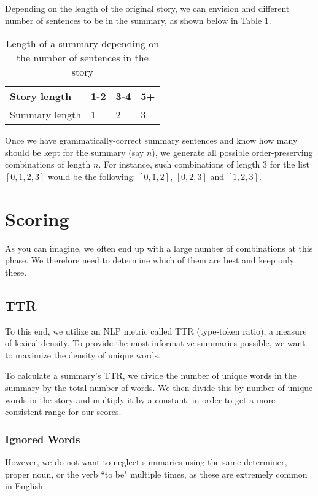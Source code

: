 Depending on the length of the original story, we can envision and different number of sentences to be in the summary, as shown below in Table \ref{tab:summary_length}.

\begin{table}[H]
\centering
\begin{tabular}{@{}llll@{}}
\toprule
Story length   & 1-2 & 3-4 & 5+ \\ \midrule
Summary length & 1   & 2   & 3  \\ \bottomrule
\end{tabular}
\caption{Length of a summary depending on the number of sentences in the story}
\label{tab:summary_length}
\end{table}

Once we have grammatically-correct summary sentences and know how many should be kept for the summary (say $n$), we generate all possible order-preserving combinations of length $n$. For instance, such combinations of length 3 for the list $[0,1,2,3]$ would be the following: $[0,1,2]$, $[0,2,3]$ and $[1,2,3]$.

\section{Scoring}
\label{sec:scoring}

As you can imagine, we often end up with a large number of combinations at this phase. We therefore need to determine which of them are best and keep only these.

\subsection{TTR}

To this end, we utilize an NLP metric called TTR (type-token ratio), a measure of lexical density. To provide the most informative summaries possible, we want to maximize the density of unique words.

To calculate a summary's TTR, we divide the number of unique words in the summary by the total number of words. We then divide this by number of unique words in the story and multiply it by a constant, in order to get a more consistent range for our scores.

\subsubsection{Ignored Words}

However, we do not want to neglect summaries using the same determiner, proper noun, or the verb ``to be" multiple times, as these are extremely common in English.

